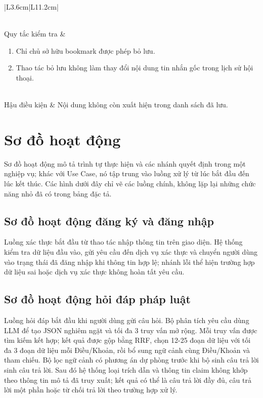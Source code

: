\documentclass[12pt,a4paper,oneside]{report}
\begin{document}
{\begin{longtable}{|L{3.6cm}|L{11.2cm}|}
\begin{enumerate}[leftmargin=*,nosep]
                          \end{enumerate}            \\
    \hline
    Quy tắc kiểm tra    & \begin{enumerate}[leftmargin=*,nosep]
                            \item Chỉ chủ sở hữu bookmark được phép bỏ lưu.
                            \item Thao tác bỏ lưu không làm thay đổi nội dung tin nhắn gốc trong lịch sử hội thoại.
                          \end{enumerate} \\
    \hline
    Hậu điều kiện       & Nội dung không còn xuất hiện trong danh sách đã lưu.                                   \\
    \hline
  \end{longtable}
}

\section{Sơ đồ hoạt động}
Sơ đồ hoạt động mô tả trình tự thực hiện và các nhánh quyết định trong một nghiệp vụ; khác với Use Case, nó tập trung vào luồng xử lý từ lúc bắt đầu đến lúc kết thúc. Các hình dưới đây chỉ vẽ các luồng chính, không lặp lại những chức năng nhỏ đã có trong bảng đặc tả.

\subsection{Sơ đồ hoạt động đăng ký và đăng nhập}
Luồng xác thực bắt đầu từ thao tác nhập thông tin trên giao diện. Hệ thống kiểm tra dữ liệu đầu vào, gửi yêu cầu đến dịch vụ xác thực và chuyển người dùng vào trạng thái đã đăng nhập khi thông tin hợp lệ; nhánh lỗi thể hiện trường hợp dữ liệu sai hoặc dịch vụ xác thực không hoàn tất yêu cầu.

\subsection{Sơ đồ hoạt động hỏi đáp pháp luật}
Luồng hỏi đáp bắt đầu khi người dùng gửi câu hỏi. Bộ phân tích yêu cầu dùng LLM để tạo JSON nghiêm ngặt và tối đa 3 truy vấn mở rộng. Mỗi truy vấn được tìm kiếm kết hợp; kết quả được gộp bằng RRF, chọn 12-25 đoạn dữ liệu với tối đa 3 đoạn dữ liệu mỗi Điều/Khoản, rồi bổ sung ngữ cảnh cùng Điều/Khoản và tham chiếu. Bộ lọc ngữ cảnh có phương án dự phòng trước khi bộ sinh câu trả lời sinh câu trả lời. Sau đó hệ thống loại trích dẫn và thông tin claim không khớp theo thông tin mô tả đã truy xuất; kết quả có thể là câu trả lời đầy đủ, câu trả lời một phần hoặc từ chối trả lời theo trường hợp xử lý.
\end{document}
